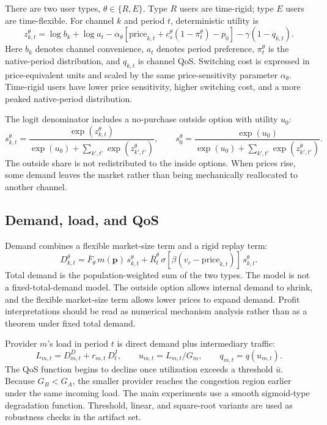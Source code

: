 \documentclass[11pt,a4paper]{article}
\newcommand{\qos}{q}
\newcommand{\D}{D}
\newcommand{\p}{\boldsymbol{p}}
\begin{document}
There are two user types, $\theta\in\{R,E\}$. Type $R$ users are time-rigid; type $E$ users are time-flexible. For channel $k$ and period $t$, deterministic utility is
\begin{equation}
  z^\theta_{k,t}=\log b_k+\log a_t
  -\alpha_\theta\!\left[\text{price}_{k,t}+c_s^\theta(1-\pi^\theta_t)-p_0\right]
  -\gamma(1-q_{k,t}).
  \label{eq:utility}
\end{equation}
Here $b_k$ denotes channel convenience, $a_t$ denotes period preference, $\pi^\theta_t$ is the native-period distribution, and $q_{k,t}$ is channel QoS. Switching cost is expressed in price-equivalent units and scaled by the same price-sensitivity parameter $\alpha_\theta$. Time-rigid users have lower price sensitivity, higher switching cost, and a more peaked native-period distribution.

The logit denominator includes a no-purchase outside option with utility $u_0$:
\begin{equation}
  s^\theta_{k,t}=\frac{\exp(z^\theta_{k,t})}{\exp(u_0)+\sum_{k',t'}\exp(z^\theta_{k',t'})},
  \qquad
  s^\theta_0=\frac{\exp(u_0)}{\exp(u_0)+\sum_{k',t'}\exp(z^\theta_{k',t'})}.
  \label{eq:share}
\end{equation}
The outside share is not redistributed to the inside options. When prices rise, some demand leaves the market rather than being mechanically reallocated to another channel.

\subsection{Demand, load, and QoS}

Demand combines a flexible market-size term and a rigid replay term:
\begin{equation}
  \D^\theta_{k,t}=\bar F_\theta\,m(\p)\,s^\theta_{k,t}
  +\bar R^\theta_t\,\sigma[\beta(v_r-\text{price}_{k,t})]\,s^\theta_{k,t}.
  \label{eq:demand}
\end{equation}
Total demand is the population-weighted sum of the two types. The model is not a fixed-total-demand model. The outside option allows internal demand to shrink, and the flexible market-size term allows lower prices to expand demand. Profit interpretations should be read as numerical mechanism analysis rather than as a theorem under fixed total demand.

Provider $m$'s load in period $t$ is direct demand plus intermediary traffic:
\begin{equation}
  L_{m,t}=\D^D_{m,t}+r_{m,t}\,\D^I_t,\qquad
  u_{m,t}=L_{m,t}/G_m,\qquad q_{m,t}=\qos(u_{m,t}).
  \label{eq:load}
\end{equation}
The QoS function begins to decline once utilization exceeds a threshold $\bar u$. Because $G_B<G_A$, the smaller provider reaches the congestion region earlier under the same incoming load. The main experiments use a smooth sigmoid-type degradation function. Threshold, linear, and square-root variants are used as robustness checks in the artifact set.
\end{document}
